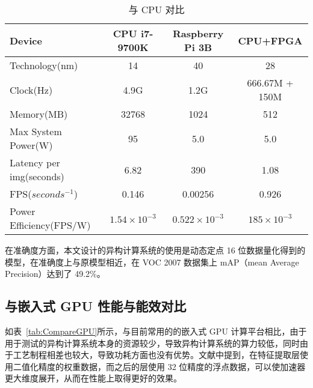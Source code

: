 \begin{table}[!htbp]
\caption{与 CPU 对比}
\label{tab:CompareCPU}
\centering
\footnotesize%
\setlength{\tabcolsep}{4pt}%
\renewcommand{\arraystretch}{1.2}%
\begin{tabular}{lccc}
\toprule
Device                  & CPU i7-9700K          & Raspberry Pi 3B       & CPU+FPGA \\
\midrule
Technology(nm)          & 14                    & 40                    & 28    \\
Clock(Hz)               & 4.9G                  & 1.2G                  & 666.67M + 150M \\
Memory(MB)              & 32768                 & 1024                  & 512   \\
Max System Power(W)     & 95                    & 5.0                   & 5.0  \\
Latency per img(seconds)& 6.82                  & 390                   & 1.08 \\
FPS($seconds^{-1}$)     & 0.146                 & 0.00256               & 0.926 \\
Power Efficiency(FPS/W) & $1.54 \times 10^{-3}$ & $0.522 \times 10^{-3}$& $185 \times 10^{-3}$ \\
\bottomrule
\end{tabular}
\end{table}

在准确度方面，本文设计的异构计算系统的使用是动态定点 16 位数据量化得到的模型，在准确度上与原模型相近，在 VOC 2007 数据集上 mAP（mean Average Precision）达到了 49.2\%。

\subsection{与嵌入式 GPU 性能与能效对比}

如表~\ref{tab:CompareGPU}所示，与目前常用的的嵌入式 GPU 计算平台相比，由于用于测试的异构计算系统本身的资源较少，导致异构计算系统的算力较低，同时由于工艺制程相差也较大，导致功耗方面也没有优势。文献\citep{nakahara2018lightweight}中提到，在特征提取层使用二值化精度的权重数据，而之后的层使用 32 位精度的浮点数据，可以使加速器更大维度展开，从而在性能上取得更好的效果。


